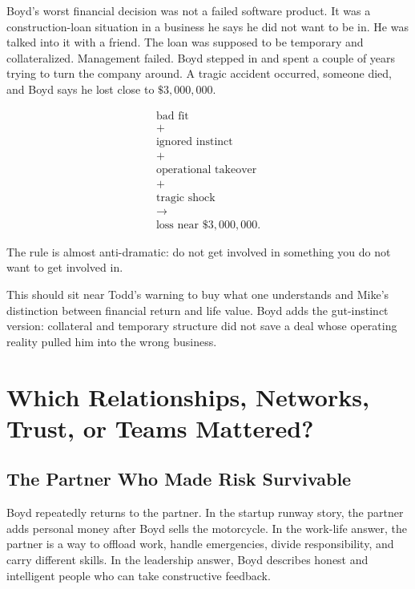 \documentclass[11pt,oneside]{book}
\begin{document}
Boyd's worst financial decision was not a failed software product. It was a construction-loan situation in a business he says he did not want to be in. He was talked into it with a friend. The loan was supposed to be temporary and collateralized. Management failed. Boyd stepped in and spent a couple of years trying to turn the company around. A tragic accident occurred, someone died, and Boyd says he lost close to \(\$3{,}000{,}000\).

\begin{equation}
\begin{gathered}
\text{bad fit}\\
+\\
\text{ignored instinct}\\
+\\
\text{operational takeover}\\
+\\
\text{tragic shock}\\
\longrightarrow\\
\text{loss near }\$3{,}000{,}000.
\end{gathered}
\end{equation}

The rule is almost anti-dramatic: do not get involved in something you do not want to get involved in.

This should sit near Todd's warning to buy what one understands and Mike's distinction between financial return and life value. Boyd adds the gut-instinct version: collateral and temporary structure did not save a deal whose operating reality pulled him into the wrong business.

\chapter{Which Relationships, Networks, Trust, or Teams Mattered?}

\section{The Partner Who Made Risk Survivable}

Boyd repeatedly returns to the partner. In the startup runway story, the partner adds personal money after Boyd sells the motorcycle. In the work-life answer, the partner is a way to offload work, handle emergencies, divide responsibility, and carry different skills. In the leadership answer, Boyd describes honest and intelligent people who can take constructive feedback.
\end{document}
